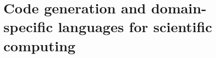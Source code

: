 \documentclass[thesis]{subfiles}
\begin{document}



\section{Code generation and domain-specific languages for scientific computing}



\cite{stroutSparsePolyhedralFramework2018} %
\cite{mirchandaneyPrinciplesRuntimeSupport1988} %
\cite{arenazInspectorExecutorAlgorithmIrregular2004} %
\end{document}
